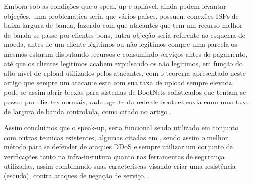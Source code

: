 \documentclass[a4paper,12pt]{article}
\begin{document}
 \vspace{0.3cm}
 
 
 Embora sob as condições que o speak-up e apliável, ainda podem levantar objeções, uma problematica seria que vários países, possuem conexões ISPs de baixa largura de banda, fazendo com que atacantes que tem um recurso melhor de banda se passe por clientes bons, outra objeção seria referente ao esquema de moeda, antes de um cliente légitimos ou não legitimos compre uma parcela os mesmos estaram disputando recursos e consumindo serviços antes do pagamento, até que os clientes legitimos acabem expulsando os não legitimos, em função do alto nível de upload utilizados pelos atacantes, com o teorema apresentado neste artigo que sempre um atacante esta com sua taxa de upload sempre elevada, pode-se assim abrir brexas para sistemas de BootNets sofisticados que tentam se passar por clientes normais, cada agente da rede de bootnet envia emm uma taxa de largura de banda controlada, como citado no artigo \cite{7160662}.
\vspace{0.3cm}

 Assim concluimos que o speak-up, seria funcional sendo utilizado em conjunto com outras tecnicas existentes, algumas citadas em \cite{7821722}, sendo assim  o melhor método para se defender de ataques DDoS e sempre utilizar um conjunto de verificações tanto na infra-instutura quanto nas ferramentas de segurança utilizadas, assim combinando suas caracteriscas visando criar uma resistência (escudo), contra ataques de negação de serviço.  
 
 
 
\vspace{2cm}


\begin{center}
\end{center}

 
\end{document}
